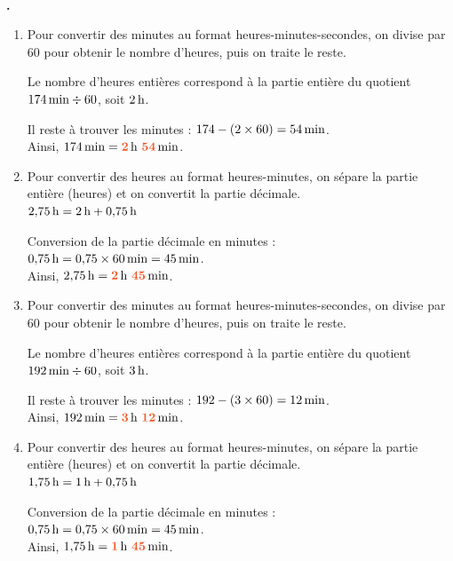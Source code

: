 \documentclass[10pt,a4paper]{article}
\newcounter{exo}
\newcommand{\exo}[1][]{%
  \refstepcounter{exo}%
  \textbf{\textcolor{Couleur8}{\\[0.3cm]\theexo.}}%
  \if\relax\detokenize{#1}\relax\else\ \textbf{#1}\fi\ %
}
\begin{document}
\exo

\begin{enumerate} 
	\item Pour convertir des minutes au format heures-minutes-secondes, on divise par $60$ pour obtenir le nombre d'heures, puis on traite le reste.

 
Le nombre d'heures entières correspond à la partie entière du quotient $174\text{\,min} \div 60$, soit $2\text{\,h}$. 

 
Il reste à trouver les minutes : $174-(2\times 60) =54\text{\,min}$.\\Ainsi, $174\text{\,min} = {\color[HTML]{F15929}\boldsymbol{2}}\text{\,h } {\color[HTML]{F15929}\boldsymbol{54}}\text{\,min}$.
	\item Pour convertir des heures au format heures-minutes, on sépare la partie entière (heures) et on convertit la partie décimale.\\$2{,}75\text{\,h} = 2\text{\,h} + 0{,}75\text{\,h}$

 
Conversion de la partie décimale en minutes :\\$0{,}75\text{\,h} = 0{,}75 \times 60\text{\,min} = 45\text{\,min}$.\\Ainsi, $2{,}75\text{\,h} = {\color[HTML]{F15929}\boldsymbol{2}}\text{\,h } {\color[HTML]{F15929}\boldsymbol{45}}\text{\,min}$.
	\item Pour convertir des minutes au format heures-minutes-secondes, on divise par $60$ pour obtenir le nombre d'heures, puis on traite le reste.

 
Le nombre d'heures entières correspond à la partie entière du quotient $192\text{\,min} \div 60$, soit $3\text{\,h}$. 

 
Il reste à trouver les minutes : $192-(3\times 60) =12\text{\,min}$.\\Ainsi, $192\text{\,min} = {\color[HTML]{F15929}\boldsymbol{3}}\text{\,h } {\color[HTML]{F15929}\boldsymbol{12}}\text{\,min}$.
	\item Pour convertir des heures au format heures-minutes, on sépare la partie entière (heures) et on convertit la partie décimale.\\$1{,}75\text{\,h} = 1\text{\,h} + 0{,}75\text{\,h}$

 
Conversion de la partie décimale en minutes :\\$0{,}75\text{\,h} = 0{,}75 \times 60\text{\,min} = 45\text{\,min}$.\\Ainsi, $1{,}75\text{\,h} = {\color[HTML]{F15929}\boldsymbol{1}}\text{\,h } {\color[HTML]{F15929}\boldsymbol{45}}\text{\,min}$.
\end{enumerate}
\end{document}
